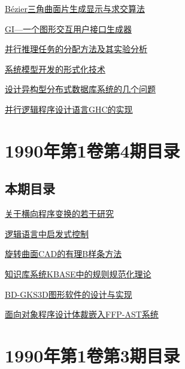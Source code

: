 \documentclass[a4paper]{article}
\begin{document}
\href{http://www.jos.org.cn/ch/reader/download_pdf.aspx?file_no=19910102&year_id=1991&quarter_id=1&falg=1}{Bézier三角曲面片生成显示与求交算法}

\href{http://www.jos.org.cn/ch/reader/download_pdf.aspx?file_no=19910103&year_id=1991&quarter_id=1&falg=1}{GI—一个图形交互用户接口生成器}

\href{http://www.jos.org.cn/ch/reader/download_pdf.aspx?file_no=19910104&year_id=1991&quarter_id=1&falg=1}{并行推理任务的分配方法及其实验分析}

\href{http://www.jos.org.cn/ch/reader/download_pdf.aspx?file_no=19910105&year_id=1991&quarter_id=1&falg=1}{系统模型开发的形式化技术}

\href{http://www.jos.org.cn/ch/reader/download_pdf.aspx?file_no=19910106&year_id=1991&quarter_id=1&falg=1}{设计异构型分布式数据库系统的几个问题}

\href{http://www.jos.org.cn/ch/reader/download_pdf.aspx?file_no=19910107&year_id=1991&quarter_id=1&falg=1}{并行逻辑程序设计语言GHC的实现}


\section{\textbf{1990年第1卷第4期目录}}
\subsection{本期目录}
\href{http://www.jos.org.cn/ch/reader/download_pdf.aspx?file_no=19900401&year_id=1990&quarter_id=4&falg=1}{关于横向程序变换的若干研究}

\href{http://www.jos.org.cn/ch/reader/download_pdf.aspx?file_no=19900402&year_id=1990&quarter_id=4&falg=1}{逻辑语言中启发式控制}

\href{http://www.jos.org.cn/ch/reader/download_pdf.aspx?file_no=19900403&year_id=1990&quarter_id=4&falg=1}{旋转曲面CAD的有理B样条方法}

\href{http://www.jos.org.cn/ch/reader/download_pdf.aspx?file_no=19900404&year_id=1990&quarter_id=4&falg=1}{知识库系统KBASE中的规则规范化理论}

\href{http://www.jos.org.cn/ch/reader/download_pdf.aspx?file_no=19900405&year_id=1990&quarter_id=4&falg=1}{BD-GKS3D图形软件的设计与实现}

\href{http://www.jos.org.cn/ch/reader/download_pdf.aspx?file_no=19900406&year_id=1990&quarter_id=4&falg=1}{面向对象程序设计体裁嵌入FFP-AST系统}


\section{\textbf{1990年第1卷第3期目录}}
\end{document}
